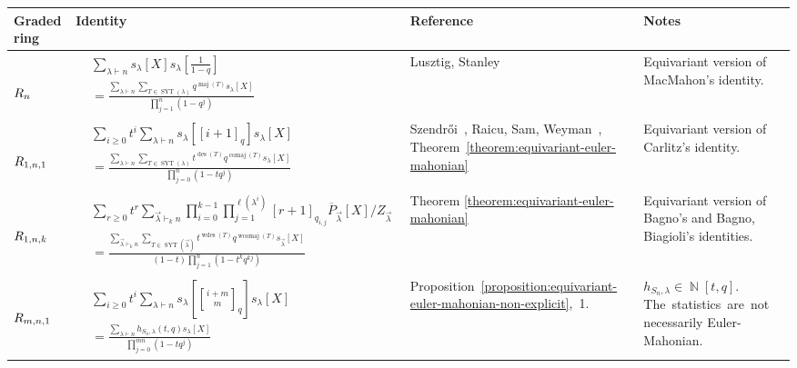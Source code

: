 \documentclass[a4paper,12pt]{amsart}
\theoremstyle{plain}
\theoremstyle{definition}
\theoremstyle{remark}
\DeclareMathOperator{\NN}{\mathbb{N}}
\DeclareMathOperator{\comaj}{comaj}
\DeclareMathOperator{\des}{des}
\DeclareMathOperator{\maj}{maj}
\DeclareMathOperator{\SYT}{SYT}
\DeclareMathOperator{\wcomaj}{wcomaj}
\DeclareMathOperator{\wdes}{wdes}
\newcommand{\qbinom}{\genfrac{[}{]}{0pt}{}}
\begin{document}
\begin{table}[H]
\centering
\small
\begin{tabular}{ | p{15mm} | l | p{32mm} |p{35mm}|}
\hline
\textbf{Graded ring} & \textbf{Identity} & \textbf{Reference} & \textbf{Notes} \\
\hline
$\rule{0pt}{3.5em} R_n$ &
$\begin{aligned} &\sum_{\lambda \vdash n} s_{\lambda}[X] s_{\lambda}\left[ \frac{1}{1-q}\right]
\\
&= \frac{ \sum_{\lambda \vdash n} \sum_{T \in \SYT(\lambda)} q^{\maj(T)} s_\lambda[X]}{\prod_{j=1}^n (1-q^j)}
\end{aligned}$ 
& Lusztig, Stanley & Equivariant version of MacMahon's identity. \\[1.5em]
\hline
$\rule{0em}{3.5em} R_{1, n, 1}$&
$\begin{aligned}
    &\sum_{i \geq 0} t^i \sum_{\lambda \vdash n} s_\lambda \left [ [i + 1]_q \right ] s_\lambda[X] \\
    &= \frac{\sum_{\lambda \vdash n} \sum_{T \in \SYT(\lambda)} t^{\des(T)} q^{\comaj(T)} s_\lambda[X]}{\prod_{j = 0}^n (1 - tq^j)}
\end{aligned}$
& Szendrői~\cite{szendroi-projective}, Raicu, Sam, Weyman~\cite{raicu-sam-weyman-modules}, Theorem~\ref{theorem:equivariant-euler-mahonian} & Equivariant version of Carlitz's identity. \\[.4em]
\hline
$\rule{0em}{3.8em} R_{1, n, k}$ & 
$\begin{aligned}
    &\sum_{r \geq 0} t^r \sum_{\vec{\lambda} \vdash_k n} \prod_{i=0}^{k-1} \prod_{j = 1}^{\ell(\lambda^i)} [r + 1]_{q_{i, j}} \overline{P}_{\vec{\lambda}}[X]/Z_{\vec{\lambda}} \\
    &= \frac{\sum_{\vec{\lambda} \vdash_k n}\sum_{T \in \SYT(\vec{\lambda})} t^{{\wdes}(T)} q^{{\wcomaj}(T)} s_{\vec{\lambda}}[X]}{(1 - t)\prod_{j = 1}^n (1 - t^kq^{kj})}
\end{aligned}$
& Theorem \ref{theorem:equivariant-euler-mahonian} & Equivariant version of Bagno's and Bagno, Biagioli's identities. \\[.4em]
\hline 
$\rule{0em}{3.5em} R_{m, n, 1}$ & $\begin{aligned}
    &\sum_{i \geq 0} t^i \sum_{\lambda \vdash n} s_\lambda \left [ \qbinom{i + m}{m}_q   \right ] s_\lambda[X] \\
    &= \frac{\sum_{\lambda \vdash n} h_{S_n, \lambda}(t, q) s_\lambda[X]}{\prod_{j = 0}^{mn} (1 - tq^j)}
\end{aligned}$ & Proposition~\ref{proposition:equivariant-euler-mahonian-non-explicit},~1. & $h_{S_n, \lambda} \in \NN[t, q]$. The~statistics~are~not necessarily Euler-Mahonian. \\[.4 em]

\end{tabular}
\end{table}
\end{document}
